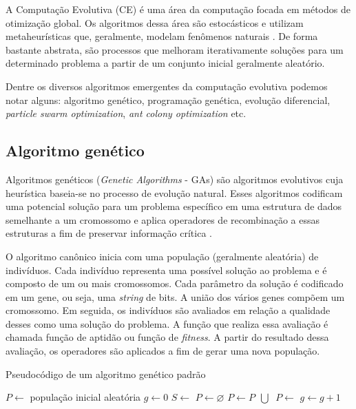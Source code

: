 A Computação Evolutiva (CE) é uma área da computação focada em métodos de otimização global. Os algoritmos dessa área são estocásticos e utilizam metaheurísticas que, geralmente, modelam fenômenos naturais \cite{michalewicz1995heuristic}. De forma bastante abstrata, são processos que melhoram iterativamente soluções para um determinado problema a partir de um conjunto inicial geralmente aleatório.

Dentre os diversos algoritmos emergentes da computação evolutiva podemos notar alguns: algoritmo genético, programação genética, evolução diferencial, \textit{particle swarm optimization}, \textit{ant colony optimization} etc.

\subsection{Algoritmo genético}

Algoritmos genéticos (\textit{Genetic Algorithms} - GAs) são algoritmos evolutivos cuja heurística baseia-se no processo de evolução natural. Esses algoritmos codificam uma potencial solução para um problema específico em uma estrutura de dados semelhante a um cromossomo e aplica operadores de recombinação a essas estruturas a fim de preservar informação crítica \cite{whitley1994genetic}.

O algoritmo canônico inicia com uma população (geralmente aleatória) de indivíduos. Cada indivíduo representa uma possível solução ao problema e é composto de um ou mais cromossomos. Cada parâmetro da solução é codificado em um gene, ou seja, uma \textit{string} de bits. A união dos vários genes compõem um cromossomo. Em seguida, os indivíduos são avaliados em relação a qualidade desses como uma solução do problema. A função que realiza essa avaliação é chamada função de aptidão ou função de \textit{fitness}. A partir do resultado dessa avaliação, os operadores são aplicados a fim de gerar uma nova população.

\begin{algorithm}[h]
    \caption{Pseudocódigo de um algoritmo genético padrão}
    \begin{algorithmic}
        \State $P \gets $ população inicial aleatória
        \State $g \gets 0$
            \State {}
            \State $S \gets$ 
            \State $P \gets \varnothing$
                \State $P \gets P \>\> \bigcup \>$ 
            \EndFor
            \State $P \gets $ 
            \State $g \gets g + 1$
        \EndWhile
    \end{algorithmic}
\end{algorithm}

